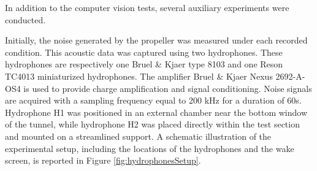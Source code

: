 In addition to the computer vision tests, several auxiliary experiments were conducted. 

Initially, the noise generated by the propeller was measured under each recorded condition. This acoustic data was captured using two hydrophones.  
These hydrophones are respectively one Bruel \& Kjaer type 8103 and one Reson TC4013 miniaturized hydrophones. The amplifier Bruel \& Kjaer Nexus 2692-A-OS4 is used to provide charge amplification and signal conditioning. Noise signals are acquired with a sampling frequency equal to 200 kHz for a duration of 60s.
Hydrophone H1 was positioned in an external chamber near the bottom window of the tunnel, while hydrophone H2 was placed directly within the test section and mounted on a streamlined support. A schematic illustration of the experimental setup, including the locations of the hydrophones and the wake screen, is reported in Figure \ref{fig:hydrophonesSetup}.

